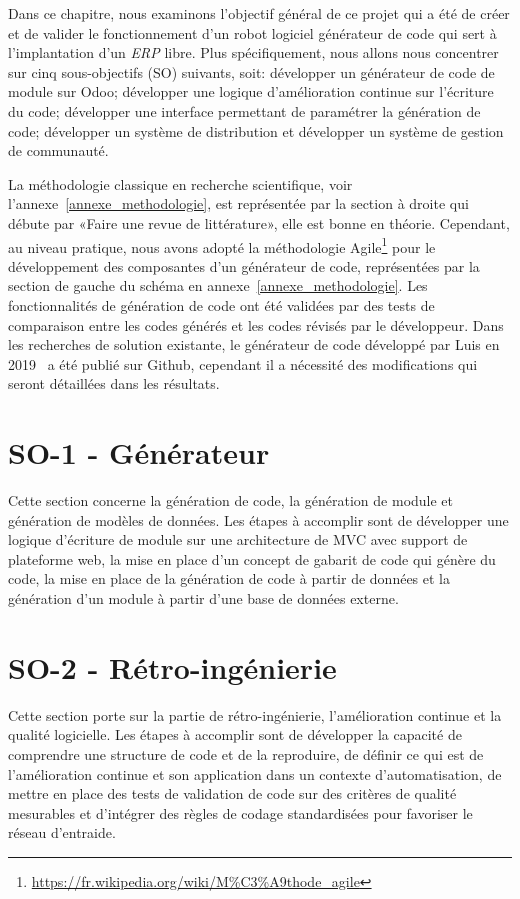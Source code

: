 \label{sec:Theme1} \label{chapitre_methode}
Dans ce chapitre, nous examinons l’objectif général de ce projet qui a été de créer et de valider le fonctionnement d’un robot logiciel générateur de code qui sert à l’implantation d’un \textit{ERP} libre. Plus spécifiquement, nous allons nous concentrer sur cinq sous-objectifs (SO) suivants, soit: développer un générateur de code de module sur Odoo; développer une logique d'amélioration continue sur l'écriture du code; développer une interface permettant de paramétrer la génération de code;
développer un système de distribution et développer un système de gestion de communauté.

La méthodologie classique en recherche scientifique, voir l'annexe~\ref{annexe_methodologie}, est représentée par la section à droite qui débute par «Faire une revue de littérature», elle est bonne en théorie. Cependant, au niveau pratique, nous avons adopté la méthodologie Agile\footnote{\url{https://fr.wikipedia.org/wiki/M\%C3\%A9thode_agile}} pour le développement des composantes d'un générateur de code, représentées par la section de gauche du schéma en annexe~\ref{annexe_methodologie}. Les fonctionnalités de génération de code ont été validées par des tests de comparaison entre les codes générés et les codes révisés par le développeur. Dans les recherches de solution existante, le générateur de code développé par Luis en 2019~\cite{bluiksnot_repo} a été publié sur Github, cependant il a nécessité des modifications qui seront détaillées dans les résultats. 

\section{SO-1 - Générateur}
Cette section concerne la génération de code, la génération de module et génération de modèles de données. Les étapes à accomplir sont de développer une logique d’écriture de module sur une architecture de MVC avec support de plateforme web, la mise en place d’un concept de gabarit de code qui génère du code, la mise en place de la génération de code à partir de données et la génération d'un module à partir d’une base de données externe.

\section{SO-2 - Rétro-ingénierie}
Cette section porte sur la partie de rétro-ingénierie, l'amélioration continue et la qualité logicielle. Les étapes à accomplir sont de développer la capacité de comprendre une structure de code et de la reproduire, de définir ce qui est de l’amélioration continue et son application dans un contexte d’automatisation, de mettre en place des tests de validation de code sur des critères de qualité mesurables et d'intégrer des règles de codage standardisées pour favoriser le réseau d’entraide.

